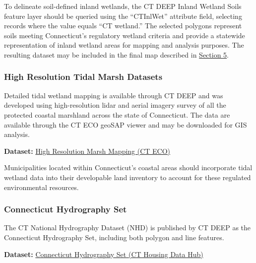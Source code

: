 \documentclass[
  letterpaper,
  DIV=11,
  numbers=noendperiod]{scrreprt}
\begin{document}
To delineate soil-defined inland wetlands, the CT DEEP Inland Wetland
Soils feature layer should be queried using the ``CTInlWet'' attribute
field, selecting records where the value equals ``CT wetland.'' The
selected polygons represent soils meeting Connecticut's regulatory
wetland criteria and provide a statewide representation of inland
wetland areas for mapping and analysis purposes. The resulting dataset
may be included in the final map described in \href{map.qmd}{Section 5}.

\subsubsection{High Resolution Tidal Marsh
Datasets}\label{sec-high-resolution-tidal-marsh-datasets}

Detailed tidal wetland mapping is available through CT DEEP and was
developed using high-resolution lidar and aerial imagery survey of all
the protected coastal marshland across the state of Connecticut. The
data are available through the CT ECO geoSAP viewer and may be
downloaded for GIS analysis.

\textbf{Dataset:}
\href{https://maps.cteco.uconn.edu/projects/highres_marsh/}{High
Resolution Marsh Mapping (CT ECO)}

\begin{tcolorbox}[enhanced jigsaw, arc=.35mm, bottomrule=.15mm, breakable, colback=white, colframe=quarto-callout-note-color-frame, left=2mm, leftrule=.75mm, opacityback=0, rightrule=.15mm, toprule=.15mm]

Municipalities located within Connecticut's coastal areas should
incorporate tidal wetland data into their developable land inventory to
account for these regulated environmental resources.

\end{tcolorbox}

\subsubsection{Connecticut Hydrography
Set}\label{sec-connecticut-hydrography-set}

The CT National Hydrography Dataset (NHD) is published by CT DEEP as the
Connecticut Hydrography Set, including both polygon and line features.

\textbf{Dataset:}
\href{https://housingmaps.ct.gov/maps/ef85cf0c55394065a8a74ea97fbd7ede/about}{Connecticut
Hydrography Set (CT Housing Data Hub)}
\end{document}
